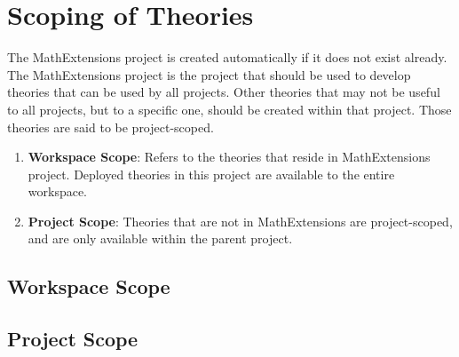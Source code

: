 \section{Scoping of Theories}
The MathExtensions project is created automatically if it does not exist already. The MathExtensions project is the project that should be used to develop theories that can be used by all projects. Other theories that may not be useful to all projects, but to a specific one, should be created within that project. Those theories are said to be project-scoped.
\begin{enumerate}
	\item \textbf{Workspace Scope}: Refers to the theories that reside in MathExtensions project. Deployed theories in this project are available to the entire workspace.
	\item  \textbf{Project Scope}: Theories that are not in MathExtensions are project-scoped, and are only available within the parent project.
\end{enumerate}

\subsection{Workspace Scope}
\subsection{Project Scope}

